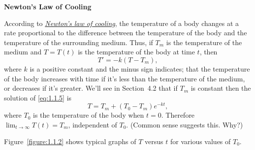 \documentclass{ximera}
\begin{document}
\textbf{Newton's Law of Cooling}

\noindent
According to
\href{http://www-history.mcs.st-and.ac.uk/Mathematicians/Newton.html}
{\color{blue}\it Newton's
law of cooling},  the temperature of a
body changes at a rate proportional to the difference between the
temperature of the body and the temperature of the surrounding medium.
 Thus, if  $T_m$ is the temperature of the
medium and
$T=T(t)$ is the temperature of the body at time $t$, then
\begin{equation} \label{eq:1.1.5}
T' = -k(T-T_m),
\end{equation}
where $k$ is a positive constant and the  minus sign indicates;   that
the temperature of the body increases with time if it's less than the
temperature of the medium, or decreases if it's  greater. We'll see
in Section~4.2 that if
$T_m$ is constant then the solution of \eqref{eq:1.1.5} is
\begin{equation} \label{eq:1.1.6}
T=T_m+(T_0-T_m)e^{-kt},
\end{equation}
where $T_0$ is the temperature of the body when $t=0$.
Therefore $\lim_{t\to\infty}T(t)=T_m$, independent of $T_0$.
(Common sense suggests this. Why?)

Figure~\ref{figure:1.1.2} shows typical graphs of $T$ versus $t$ for
various values of  $T_0$.

\begin{image}
{\def\length{sqrt(1+(x+y)^2)}
}
\end{image}
\end{document}
